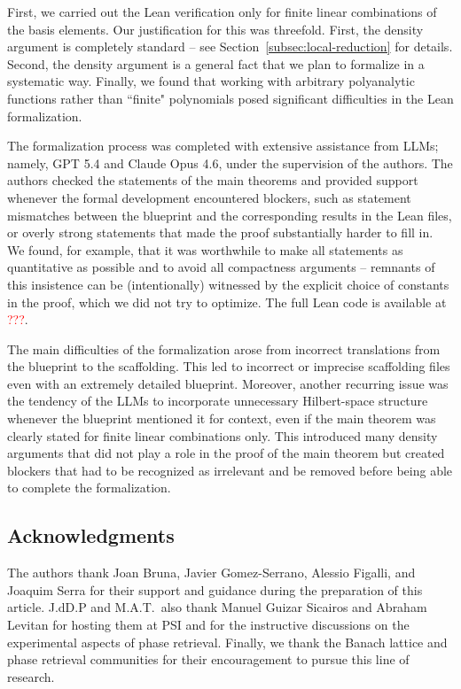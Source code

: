 \documentclass[11pt]{amsart}
\theoremstyle{remark}
\begin{document}
First, we carried out the Lean verification only for finite linear combinations of the basis elements. Our justification for this was threefold. First, the density argument is completely standard -- see Section~\ref{subsec:local-reduction} for details. Second, the density argument is a general fact that we plan to formalize in a systematic way. Finally, we found that working with arbitrary polyanalytic functions rather than ``finite" polynomials posed significant difficulties in the Lean formalization. 
\medskip


The formalization process was completed with extensive assistance from LLMs; namely, GPT 5.4 and Claude Opus 4.6, under the supervision of the authors. The authors checked the statements of the main theorems and provided support whenever the formal development encountered blockers, such as statement mismatches between the blueprint and the corresponding results in the Lean files, or overly strong statements that made the proof substantially harder to fill in. We found, for example, that it was worthwhile to make all statements as quantitative as possible and to avoid all compactness arguments -- remnants of this insistence can be (intentionally) witnessed by the explicit choice of constants in the proof, which we did not try to optimize. The full Lean code is available at \textcolor{red}{???}. 
\medskip

The main difficulties of the formalization arose from incorrect translations from the blueprint to the scaffolding. This led to incorrect or imprecise scaffolding files even with an extremely detailed blueprint. Moreover, another recurring issue was the tendency of the LLMs to incorporate unnecessary Hilbert-space structure whenever the blueprint mentioned it for context, even if the main theorem was clearly stated for finite linear combinations only. This introduced many density arguments that did not play a role in the proof of the main theorem but created blockers that had to be recognized as irrelevant and be removed before being able to complete the formalization.



\subsection{Acknowledgments}
The authors thank Joan Bruna, Javier Gomez-Serrano, Alessio Figalli, and Joaquim Serra for their support and guidance during the preparation of this article. J.dD.P and M.A.T.~also thank Manuel Guizar Sicairos and Abraham Levitan for hosting them at PSI and for the instructive discussions on the experimental aspects of phase retrieval. Finally, we thank the Banach lattice and phase retrieval communities for their encouragement to pursue this line of research.
\end{document}
